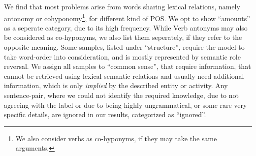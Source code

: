 We find that most problems arise from words sharing lexical relations, namely antonomy or cohyponomy\footnote{We also consider verbs as co-hyponyms, if they may take the same arguments.}, for different kind of \ac{POS}. We opt to show ``amounts'' as a seperate category, due to its high frequency. While Verb antonyms may also be considered as co-hyponyms, we also list them seperately, if they refer to the opposite meaning. Some samples, listed under ``structure'', require the model to take word-order into consideration, and is mostly represented by semantic role reversal. We assign all samples to ``common sense'', that require information, that cannot be retrieved using lexical semantic relations and usually need additional information, which is only \textit{implied} by the described entity or activity. Any sentence-pair, where we could not identify the required knowledge, due to not agreeing with the label or due to being highly ungrammatical, or some rare very specific details, are ignored in our results, categorized as ``ignored''.

